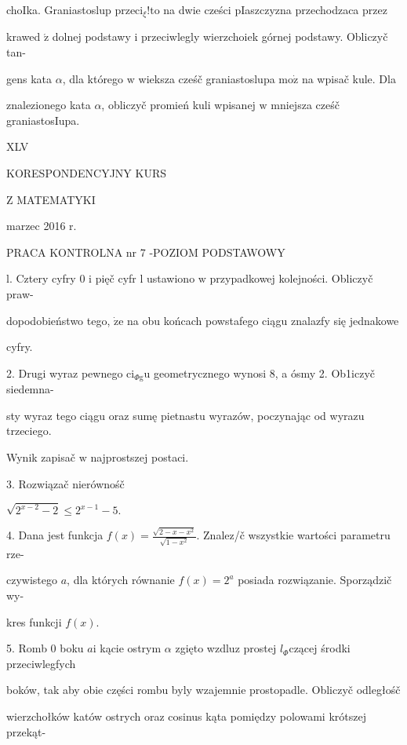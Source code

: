 \documentclass[a4paper,12pt]{article}
\begin{document}
choIka. Graniastoslup $\mathrm{p}\mathrm{r}\mathrm{z}\mathrm{e}\mathrm{c}\mathrm{i}_{\xi}!\mathrm{t}\mathrm{o}$ na dwie cześci pIaszczyzna przechodzaca przez

krawed $\acute{\mathrm{z}}$ dolnej podstawy $\mathrm{i}$ przeciwlegly wierzchoiek górnej podstawy. Obliczyč tan-

gens kata $\alpha$, dla którego $\mathrm{w}$ wieksza cześč graniastoslupa $\mathrm{m}\mathrm{o}\dot{\mathrm{z}}$ na wpisač kule. Dla

znalezionego kata $\alpha$, obliczyč promień kuli wpisanej $\mathrm{w}$ mniejsza cześč graniastosIupa.







XLV

KORESPONDENCYJNY KURS

Z MATEMATYKI

marzec 2016 r.

PRACA KONTROLNA nr 7 -POZIOM PODSTAWOWY

l. Cztery cyfry 0 $\mathrm{i}$ pięč cyfr l ustawiono $\mathrm{w}$ przypadkowej kolejności. Obliczyč praw-

dopodobieństwo tego, $\dot{\mathrm{z}}\mathrm{e}$ na obu końcach powstafego ciągu znalazfy się jednakowe

cyfry.

2. Drugi wyraz pewnego $\mathrm{c}\mathrm{i}_{\Phi \mathrm{g}}\mathrm{u}$ geometrycznego wynosi 8, a ósmy 2. Ob1iczyč siedemna-

sty wyraz tego ciągu oraz sumę pietnastu wyrazów, poczynając od wyrazu trzeciego.

Wynik zapisač $\mathrm{w}$ najprostszej postaci.

3. Rozwiązač nierównośč

$\sqrt{2^{x-2}-2}\leq 2^{x-1}-5.$

4. Dana jest funkcja $f(x)=\displaystyle \frac{\sqrt{2-x-x^{2}}}{\sqrt{1-x^{2}}}$. Znalez/č wszystkie wartości parametru rze-

czywistego $a$, dla których równanie $f(x)=2^{a}$ posiada rozwiązanie. Sporządzič wy-

kres funkcji $f(x).$

5. Romb $0$ boku $a\mathrm{i}$ kącie ostrym $\alpha$ zgięto wzdluz prostej $l_{\Phi}$czącej środki przeciwlegfych

boków, tak aby obie części rombu byly wzajemnie prostopadle. Obliczyč odległośč

wierzchołków katów ostrych oraz cosinus kąta pomiędzy polowami krótszej przekąt-
\end{document}
